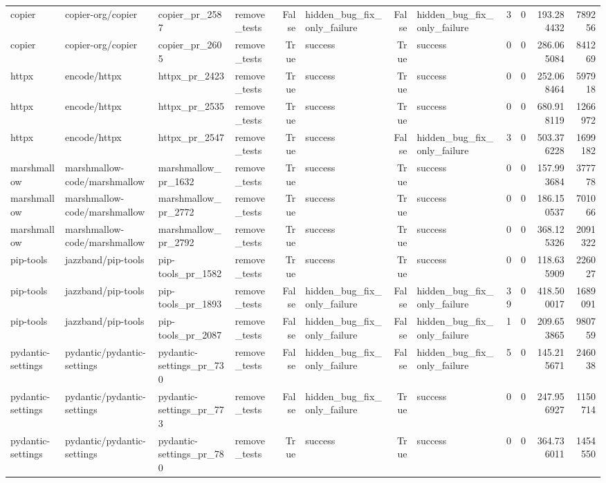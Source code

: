 \begin{tabular}{llllrlrlrrrr}
copier & copier-org/copier & copier\_pr\_2587 & remove\_tests & False & hidden\_bug\_fix\_only\_failure & False & hidden\_bug\_fix\_only\_failure & 3 & 0 & 193.284432 & 789256 \\
copier & copier-org/copier & copier\_pr\_2605 & remove\_tests & True & success & True & success & 0 & 0 & 286.065084 & 841269 \\
httpx & encode/httpx & httpx\_pr\_2423 & remove\_tests & True & success & True & success & 0 & 0 & 252.068464 & 597918 \\
httpx & encode/httpx & httpx\_pr\_2535 & remove\_tests & True & success & True & success & 0 & 0 & 680.918119 & 1266972 \\
httpx & encode/httpx & httpx\_pr\_2547 & remove\_tests & True & success & False & hidden\_bug\_fix\_only\_failure & 3 & 0 & 503.376228 & 1699182 \\
marshmallow & marshmallow-code/marshmallow & marshmallow\_pr\_1632 & remove\_tests & True & success & True & success & 0 & 0 & 157.993684 & 377778 \\
marshmallow & marshmallow-code/marshmallow & marshmallow\_pr\_2772 & remove\_tests & True & success & True & success & 0 & 0 & 186.150537 & 701066 \\
marshmallow & marshmallow-code/marshmallow & marshmallow\_pr\_2792 & remove\_tests & True & success & True & success & 0 & 0 & 368.125326 & 2091322 \\
pip-tools & jazzband/pip-tools & pip-tools\_pr\_1582 & remove\_tests & True & success & True & success & 0 & 0 & 118.635909 & 226027 \\
pip-tools & jazzband/pip-tools & pip-tools\_pr\_1893 & remove\_tests & False & hidden\_bug\_fix\_only\_failure & False & hidden\_bug\_fix\_only\_failure & 39 & 0 & 418.500017 & 1689091 \\
pip-tools & jazzband/pip-tools & pip-tools\_pr\_2087 & remove\_tests & False & hidden\_bug\_fix\_only\_failure & False & hidden\_bug\_fix\_only\_failure & 1 & 0 & 209.653865 & 980759 \\
pydantic-settings & pydantic/pydantic-settings & pydantic-settings\_pr\_730 & remove\_tests & False & hidden\_bug\_fix\_only\_failure & False & hidden\_bug\_fix\_only\_failure & 5 & 0 & 145.215671 & 246038 \\
pydantic-settings & pydantic/pydantic-settings & pydantic-settings\_pr\_773 & remove\_tests & False & hidden\_bug\_fix\_only\_failure & True & success & 0 & 0 & 247.956927 & 1150714 \\
pydantic-settings & pydantic/pydantic-settings & pydantic-settings\_pr\_780 & remove\_tests & True & success & True & success & 0 & 0 & 364.736011 & 1454550 \\

\end{tabular}
